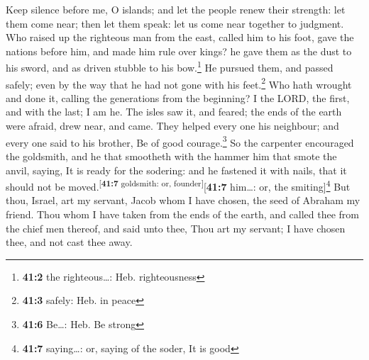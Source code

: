  Keep silence before me, O islands; and let the people
renew their strength: let them come near; then let them speak: let us
come near together to judgment.  Who raised up the
righteous man from the east, called him to his foot, gave the nations
before him, and made him rule over kings? he gave them as the dust to
his sword, and as driven stubble to his bow.\footnote{\textbf{41:2} the
  righteous\ldots: Heb. righteousness}  He pursued them,
and passed safely; even by the way that he had not gone with his
feet.\footnote{\textbf{41:3} safely: Heb. in peace}  Who
hath wrought and done it, calling the generations from the beginning? I
the LORD, the first, and with the last; I am he.  The
isles saw it, and feared; the ends of the earth were afraid, drew near,
and came.  They helped every one his neighbour; and every
one said to his brother, Be of good courage.\footnote{\textbf{41:6}
  Be\ldots: Heb. Be strong}  So the carpenter encouraged
the goldsmith, and he that smootheth with the hammer him that smote the
anvil, saying, It is ready for the sodering: and he fastened it with
nails, that it should not be moved.\textsuperscript{{[}\textbf{41:7}
goldsmith: or, founder{]}}{[}\textbf{41:7} him\ldots: or, the
smiting{]}\footnote{\textbf{41:7} saying\ldots: or, saying of the soder,
  It is good}  But thou, Israel, art my servant, Jacob
whom I have chosen, the seed of Abraham my friend.  Thou
whom I have taken from the ends of the earth, and called thee from the
chief men thereof, and said unto thee, Thou art my servant; I have
chosen thee, and not cast thee away.


